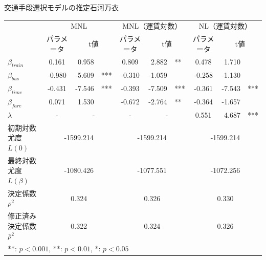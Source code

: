 \begin{column}{交通手段選択モデルの推定}{石河万衣}
\begin{center}
    \begin{tabular}{l c r@{\,}l c r@{\,}l c r@{\,}l}
    \toprule
       & \multicolumn{3}{c}{MNL} & \multicolumn{3}{c}{MNL（運賃対数）} & \multicolumn{3}{c}{NL（運賃対数）} \\
       & パラメータ & \multicolumn{2}{c}{t値} & パラメータ & \multicolumn{2}{c}{t値} & パラメータ & \multicolumn{2}{c}{t値} \\
    \midrule
    $\beta_{train}$ & 0.161 & 0.958 & & 0.809 & 2.882 & ** & 0.478 & 1.710 & \\
    $\beta_{bus}$   & -0.980 & -5.609 & *** & -0.310 & -1.059 & & -0.258 & -1.130 & \\
    $\beta_{time}$  & -0.431 & -7.546 & *** & -0.393 & -7.509 & *** & -0.361 & -7.543 & *** \\
    $\beta_{fare}$  & 0.071 & 1.530 & & -0.672 & -2.764 & ** & -0.364 & -1.657 & \\
    $\lambda$       & - & \multicolumn{2}{c}{-} & - & \multicolumn{2}{c}{-} & 0.551 & 4.687 & *** \\
    \midrule
    初期対数尤度 $L(0)$ & \multicolumn{3}{c}{-1599.214} & \multicolumn{3}{c}{-1599.214} & \multicolumn{3}{c}{-1599.214} \\
    最終対数尤度 $L(\beta)$ & \multicolumn{3}{c}{-1080.426} & \multicolumn{3}{c}{-1077.551} & \multicolumn{3}{c}{-1072.256} \\
    決定係数 $\rho^2$ & \multicolumn{3}{c}{0.324} & \multicolumn{3}{c}{0.326} & \multicolumn{3}{c}{0.330} \\
    修正済み決定係数 $\bar{\rho}^2$ & \multicolumn{3}{c}{0.322} & \multicolumn{3}{c}{0.324} & \multicolumn{3}{c}{0.326} \\
    \bottomrule
    \multicolumn{10}{l}{\footnotesize ***: $p < 0.001$, **: $p < 0.01$, *: $p < 0.05$} \\
    \end{tabular}
\end{center}

\end{column}
\clearpage